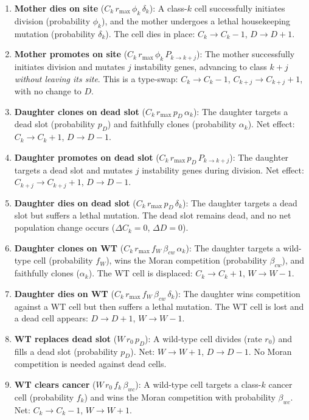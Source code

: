\documentclass[11pt,a4paper]{article}
\begin{document}
\begin{enumerate}
    \item \textbf{Mother dies on site} ($C_k\, r_{\text{max}}\, \phi_k\, \delta_k$): A class-$k$ cell successfully initiates division (probability $\phi_k$), and the mother undergoes a lethal housekeeping mutation (probability $\delta_k$). The cell dies in place: $C_k \to C_k - 1$, $D \to D + 1$.

    \item \textbf{Mother promotes on site} ($C_k\, r_{\text{max}}\, \phi_k\, P_{k \to k+j}$): The mother successfully initiates division and mutates $j$ instability genes, advancing to class $k+j$ \emph{without leaving its site}. This is a type-swap: $C_k \to C_k - 1$, $C_{k+j} \to C_{k+j} + 1$, with no change to $D$.

    \item \textbf{Daughter clones on dead slot} ($C_k\, r_{\text{max}}\, p_D\, \alpha_k$): The daughter targets a dead slot (probability $p_D$) and faithfully clones (probability $\alpha_k$). Net effect: $C_k \to C_k + 1$, $D \to D - 1$.

    \item \textbf{Daughter promotes on dead slot} ($C_k\, r_{\text{max}}\, p_D\, P_{k \to k+j}$): The daughter targets a dead slot and mutates $j$ instability genes during division. Net effect: $C_{k+j} \to C_{k+j} + 1$, $D \to D - 1$.

    \item \textbf{Daughter dies on dead slot} ($C_k\, r_{\text{max}}\, p_D\, \delta_k$): The daughter targets a dead slot but suffers a lethal mutation. The dead slot remains dead, and no net population change occurs ($\Delta C_k = 0$, $\Delta D = 0$).

    \item \textbf{Daughter clones on WT} ($C_k\, r_{\text{max}}\, f_W\, \beta_{cw}\, \alpha_k$): The daughter targets a wild-type cell (probability $f_W$), wins the Moran competition (probability $\beta_{cw}$), and faithfully clones ($\alpha_k$). The WT cell is displaced: $C_k \to C_k + 1$, $W \to W - 1$.

    \item \textbf{Daughter dies on WT} ($C_k\, r_{\text{max}}\, f_W\, \beta_{cw}\, \delta_k$): The daughter wins competition against a WT cell but then suffers a lethal mutation. The WT cell is lost and a dead cell appears: $D \to D + 1$, $W \to W - 1$.

    \item \textbf{WT replaces dead slot} ($W\, r_0\, p_D$): A wild-type cell divides (rate $r_0$) and fills a dead slot (probability $p_D$). Net: $W \to W + 1$, $D \to D - 1$. No Moran competition is needed against dead cells.

    \item \textbf{WT clears cancer} ($W\, r_0\, f_k\, \beta_{wc}$): A wild-type cell targets a class-$k$ cancer cell (probability $f_k$) and wins the Moran competition with probability $\beta_{wc}$. Net: $C_k \to C_k - 1$, $W \to W + 1$.
\end{enumerate}
\end{document}
